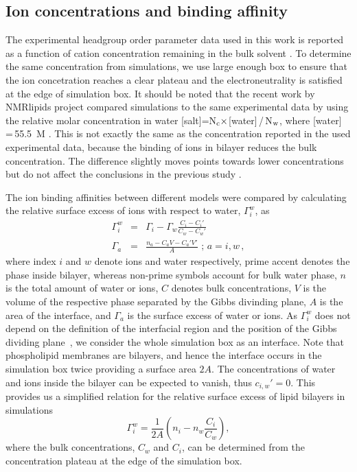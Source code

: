 \documentclass[aip,jcp,twocolumn]{revtex4}
\begin{document}
\subsection{Ion concentrations and binding affinity}
The experimental headgroup order parameter data used
in this work is reported as a function of 
cation concentration remaining in the bulk 
solvent \cite{akutsu81,altenbach84}. 
To determine the same concentration from simulations, we
use large enough box to ensure that the ion concetration
reaches a clear plateau and the electroneutrality
is satisfied at the edge of simulation box. It should be noted that the recent work
by NMRlipids project compared simulations to the same 
experimental data by using the relative molar concentration in water
[salt]=N$_{\rm c} \times$[water]\,/\,N$_{\rm w}$, where [water]\,=\,55.5~M \cite{catte16}.
This is not exactly the same as the concentration reported in the used experimental
data, because the binding of ions in bilayer reduces the bulk concentration.
The difference slightly moves points towards lower concentrations but do not 
affect the conclusions in the previous study \cite{catte16}. 

The ion binding affinities between different models were compared by calculating
the relative surface excess of ions with respect to water, $\Gamma_i^w$, as \cite{chattorajBOOK}
\begin{eqnarray}
  \Gamma_i^w   &=& \Gamma_i-\Gamma_w \frac{C_i-C_i'}{C_w-C_w'} \\
  \Gamma_{a} &=& \frac{n_{a} - C_{a} V - C_{a}' V'}{A} \, \, ; \, a=i,w \, ,
\end{eqnarray}
where index $i$ and $w$ denote ions and water respectively,
prime accent denotes the phase inside bilayer, 
whereas non-prime symbols account for bulk water phase,
$n$ is the total amount of water or ions,
$C$ denotes bulk concentrations, 
$V$ is the volume of the respective phase separated by the Gibbs divinding plane, 
$A$ is the area of the interface, 
and $\Gamma_a$ is the surface excess of water or ions. 
As $\Gamma_i^w$ does not depend on the definition of the interfacial region
and the position of the Gibbs dividing plane~\cite{chattorajBOOK},
we consider the whole simulation box as an interface. 
Note that phospholipid membranes are bilayers, 
and hence the interface occurs in the simulation box twice
providing a surface area $2A$.
The concentrations of water and ions inside
the bilayer can be expected to vanish, thus $c_{i,w}'=0$.
This provides us a simplified relation for 
the relative surface excess of lipid bilayers in simulations
\begin{equation}\label{surfexcess}
  \Gamma_i^w=\frac{1}{2A} \left ( n_i - n_w \frac{C_i}{C_w} \right ) ,
\end{equation}
where the bulk concentrations, $C_w$ and $C_i$, can be determined
from the concentration plateau at the edge of the simulation box.
\end{document}
